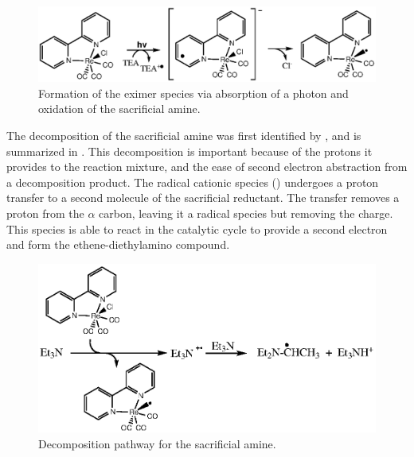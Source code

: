 \begin{figure}[!htb]
 \begin{center}
  \includegraphics[clip=true, width=120mm, keepaspectratio]{images/eximer.eps}
 \end{center}
\caption{Formation of the eximer species via absorption of a photon and oxidation of the sacrificial amine.}
\label{fig.eximer}
\end{figure} 

The decomposition of the sacrificial amine was first identified by , and is summarized in \autocite{fig.decomp}. This decomposition is important because of the protons it provides to the reaction mixture, and the ease of second electron abstraction from a decomposition product. The radical cationic species () undergoes a proton transfer to a second molecule of the sacrificial reductant. The transfer removes a proton from the $\alpha$ carbon, leaving it a radical species but removing the charge. This species is able to react in the catalytic cycle to provide a second electron and form the ethene-diethylamino compound.

\begin{figure}[!htb]
 \begin{center}
  \includegraphics[clip=true, width=120mm, keepaspectratio]{images/reddecomp.eps}
 \end{center}
\caption{Decomposition pathway for the sacrificial amine.}
\label{fig.decomp}
\end{figure} 

